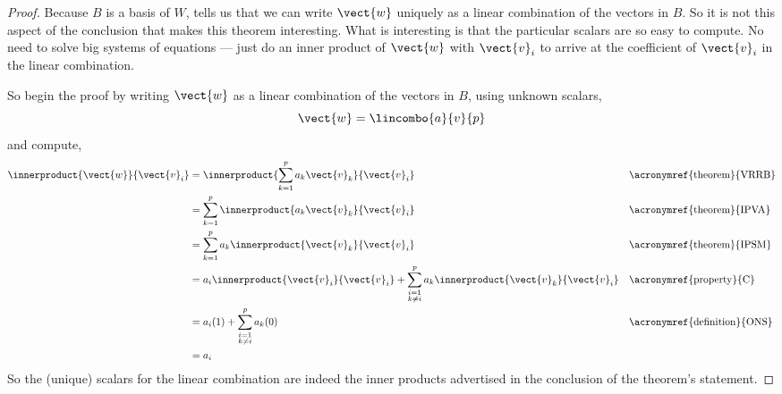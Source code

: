 \begin{proof}
Because $B$ is a basis of $W$,  tells us that we can write $\vect{w}$ uniquely as a linear combination of the vectors in $B$.  So it is not this aspect of the conclusion that makes this theorem interesting.  What is interesting is that the particular scalars are so easy to compute.  No need to solve big systems of equations --- just do an inner product of $\vect{w}$ with $\vect{v}_i$ to arrive at the coefficient of $\vect{v}_i$ in the linear combination.\par
%
So begin the proof by writing $\vect{w}$ as a linear combination of the vectors in $B$, using unknown scalars,
%
\begin{equation*}
\vect{w}=\lincombo{a}{v}{p}
\end{equation*}
%
and compute,
%
\begin{align*}
\innerproduct{\vect{w}}{\vect{v}_i}
&=\innerproduct{\sum_{k=1}^{p}a_k\vect{v}_k}{\vect{v}_i}
&&\text{\acronymref{theorem}{VRRB}}\\
%
&=\sum_{k=1}^{p}\innerproduct{a_k\vect{v}_k}{\vect{v}_i}
&&\text{\acronymref{theorem}{IPVA}}\\
%
&=\sum_{k=1}^{p}a_k\innerproduct{\vect{v}_k}{\vect{v}_i}
&&\text{\acronymref{theorem}{IPSM}}\\
%
&=a_i\innerproduct{\vect{v}_i}{\vect{v}_i}+
\sum_{\substack{i=1\\k\neq i}}^{p}a_k\innerproduct{\vect{v}_k}{\vect{v}_i}
&&\text{\acronymref{property}{C}}\\
%
&=a_i(1)+\sum_{\substack{i=1\\k\neq i}}^{p}a_k(0)
&&\text{\acronymref{definition}{ONS}}\\
%
&=a_i
\end{align*}
%
So the (unique) scalars for the linear combination are indeed the inner products advertised in the conclusion of the theorem's statement.
\end{proof}
%
%
